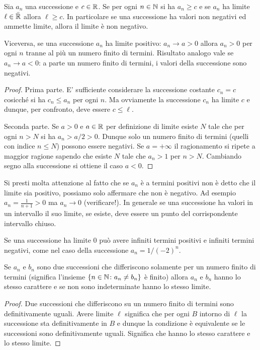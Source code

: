 \begin{corollary}
\mymark{***}
Sia $a_n$ una successione e $c\in \mathbb R$.
Se per ogni $n\in \mathbb N$ si ha $a_n \ge c$ e se $a_n$ ha limite $\ell \in \bar {\mathbb R}$
allora $\ell \ge c$.
In particolare se una successione ha valori non negativi
ed ammette limite, allora
il limite è non negativo.

Viceversa, se una successione $a_n$ ha limite positivo:
$a_n \to a >0$ allora $a_n>0$ per ogni $n$ tranne
al più un numero finito di termini.
 Risultato analogo vale se $a_n \to a <0$: a parte un numero
 finito di termini, i valori della successione sono negativi.
\end{corollary}
%
\begin{proof}
\mymark{**}
Prima parte.
E' sufficiente considerare la successione costante $c_n = c$
cosicché si ha $c_n \le a_n$ per ogni $n$. Ma ovviamente
la successione $c_n$ ha limite $c$ e dunque, per confronto,
deve essere $c\le \ell$.

Seconda parte. Se $a>0$ e $a\in \mathbb R$
per definizione di limite esiste $N$
tale che per ogni $n>N$ si ha $a_n> a/2 > 0$. Dunque solo
un numero finito di termini (quelli con indice $n\le N$)
possono essere negativi. Se $a=+\infty$ il ragionamento
si ripete a maggior ragione sapendo che esiste $N$
tale che $a_n>1$ per $n>N$.
Cambiando segno alla successione si ottiene il caso $a<0$.
\end{proof}

Si presti molta attenzione al fatto che se $a_n$ è a termini positivi
non è detto che il limite sia positivo, possiamo solo affermare
che non è negativo. Ad esempio $a_n = \frac{1}{n+1}>0$
ma $a_n \to 0$ (verificare!).
In generale se una successione ha valori in un intervallo il suo limite,
se esiste, deve essere un punto del corrispondente intervallo chiuso.

Se una successione ha limite $0$ può avere infiniti termini
positivi e infiniti termini negativi, come nel caso
della successione $a_n = 1/(-2)^n$.

\begin{theorem}
\mymark{**}
%
Se $a_n$ e $b_n$ sono due successioni
che differiscono solamente per un numero finito di termini
(significa l'insieme $\{n\in \mathbb N\colon a_n \neq b_n\}$ è finito)
allora $a_n$ e $b_n$ hanno lo stesso carattere e se non
sono indeterminate hanno lo stesso limite.
\end{theorem}
%
\begin{proof}
Due successioni che differiscono su un numero finito
di termini sono definitivamente uguali.
Avere limite $\ell$ significa che per ogni $B$ intorno di $\ell$
la successione sta definitivamente in $B$ e dunque la condizione
è equivalente se le successioni sono definitivamente uguali.
Significa che hanno lo stesso carattere e lo stesso limite.
\end{proof}

